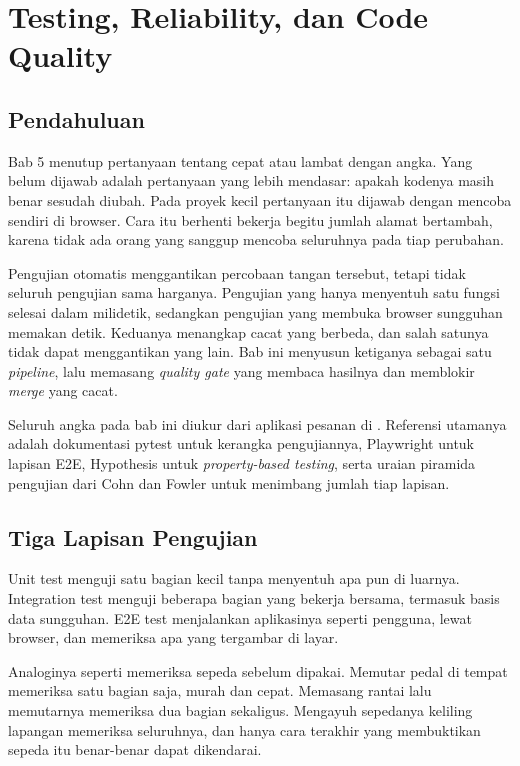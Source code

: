\chapter{Testing, Reliability, dan Code Quality}
\label{ch:testing}

\section{Pendahuluan}

Bab 5 menutup pertanyaan tentang cepat atau lambat dengan angka. Yang belum
dijawab adalah pertanyaan yang lebih mendasar: apakah kodenya masih benar
sesudah diubah. Pada proyek kecil pertanyaan itu dijawab dengan mencoba
sendiri di browser. Cara itu berhenti bekerja begitu jumlah alamat bertambah,
karena tidak ada orang yang sanggup mencoba seluruhnya pada tiap perubahan.

Pengujian otomatis menggantikan percobaan tangan tersebut, tetapi tidak
seluruh pengujian sama harganya. Pengujian yang hanya menyentuh satu fungsi
selesai dalam milidetik, sedangkan pengujian yang membuka browser sungguhan
memakan detik. Keduanya menangkap cacat yang berbeda, dan salah satunya tidak
dapat menggantikan yang lain. Bab ini menyusun ketiganya sebagai satu
\textit{pipeline}, lalu memasang \textit{quality gate} yang membaca hasilnya
dan memblokir \textit{merge} yang cacat.

Seluruh angka pada bab ini diukur dari aplikasi pesanan di
. Referensi utamanya adalah dokumentasi pytest
\cite{pytest-docs} untuk kerangka pengujiannya, Playwright
\cite{playwright-docs} untuk lapisan E2E, Hypothesis
\cite{hypothesis-docs} untuk \textit{property-based testing}, serta uraian
piramida pengujian dari Cohn \cite{cohn2009succeeding} dan Fowler
\cite{fowler-pyramid} untuk menimbang jumlah tiap lapisan.

\section{Tiga Lapisan Pengujian}

Unit test menguji satu bagian kecil tanpa menyentuh apa pun di luarnya.
Integration test menguji beberapa bagian yang bekerja bersama, termasuk basis
data sungguhan. E2E test menjalankan aplikasinya seperti pengguna, lewat
browser, dan memeriksa apa yang tergambar di layar.

Analoginya seperti memeriksa sepeda sebelum dipakai. Memutar pedal di tempat
memeriksa satu bagian saja, murah dan cepat. Memasang rantai lalu memutarnya
memeriksa dua bagian sekaligus. Mengayuh sepedanya keliling lapangan
memeriksa seluruhnya, dan hanya cara terakhir yang membuktikan sepeda itu
benar-benar dapat dikendarai.

